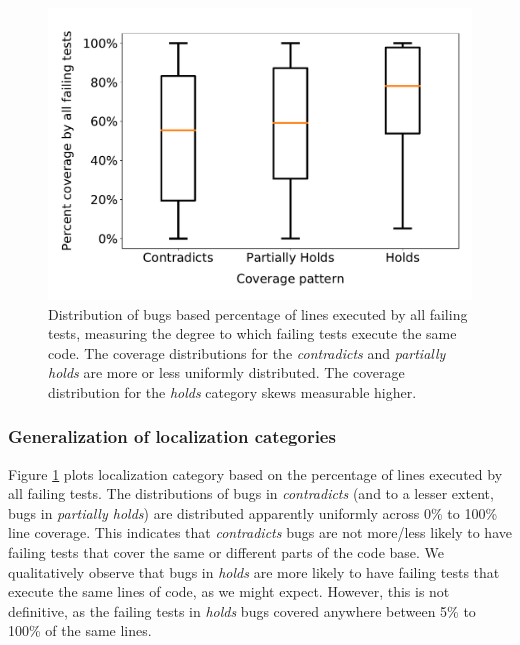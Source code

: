 \documentclass[10pt, conference]{IEEEtran}
\newcommand\todo[1]{\textcolor{red}{#1}}
\begin{document}
\begin{figure}
	\includegraphics[width=\linewidth,left]{img/coverage-buggy.pdf}
	\caption{\small	\label{fig:coverage-buggy} Distribution of bugs based percentage of lines 
	executed by all failing tests, measuring the degree to which failing tests execute the same 
	code. The coverage distributions for the \emph{contradicts} and \emph{partially holds} are more or 
	less uniformly distributed. The coverage
	distribution for the \emph{holds} category skews measurable higher. 
      } %
\end{figure}

\subsubsection{Generalization of localization categories}
Figure \ref{fig:coverage-buggy} plots localization category based on the
percentage of lines executed by all failing tests. 
%
The distributions of bugs in \emph{contradicts} (and to a lesser extent, bugs in \emph{partially 
holds}) are 
distributed apparently uniformly across 0\% to 100\% line coverage. This indicates that \emph{contradicts} 
bugs are 
not more/less likely to have failing tests that cover the same or different parts of the code 
base.
%
We qualitatively observe that bugs in \emph{holds} are more likely to have 
failing tests that execute the same lines of code, as we might expect. However, this is not 
definitive, as the failing tests in \emph{holds} bugs covered anywhere between 
5\% to 100\% of the same lines.
\end{document}
